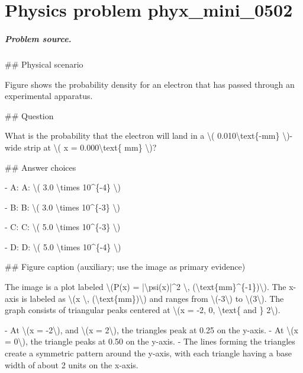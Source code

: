 
\chapter{Physics problem phyx\_mini\_0502}
\label{ch:PhyXMiniProblems_problem_phyx_mini_0502}

\paragraph{Problem source.}
\#\# Physical scenario

Figure shows the probability density for an electron that has passed through an experimental apparatus.

\#\# Question

What is the probability that the electron will land in a \textbackslash{}( 0.010\textbackslash{}text\{-mm\} \textbackslash{})-wide strip at \textbackslash{}( x = 0.000\textbackslash{}text\{ mm\} \textbackslash{})?

\#\# Answer choices

- A: A: \textbackslash{}( 3.0 \textbackslash{}times 10\textasciicircum{}\{-4\} \textbackslash{})

- B: B: \textbackslash{}( 3.0 \textbackslash{}times 10\textasciicircum{}\{-3\} \textbackslash{})

- C: C: \textbackslash{}( 5.0 \textbackslash{}times 10\textasciicircum{}\{-3\} \textbackslash{})

- D: D: \textbackslash{}( 5.0 \textbackslash{}times 10\textasciicircum{}\{-4\} \textbackslash{})

\#\# Figure caption (auxiliary; use the image as primary evidence)

The image is a plot labeled \textbackslash{}(P(x) = |\textbackslash{}psi(x)|\textasciicircum{}2 \textbackslash{}, (\textbackslash{}text\{mm\}\textasciicircum{}\{-1\})\textbackslash{}). The x-axis is labeled as \textbackslash{}(x \textbackslash{}, (\textbackslash{}text\{mm\})\textbackslash{}) and ranges from \textbackslash{}(-3\textbackslash{}) to \textbackslash{}(3\textbackslash{}). The graph consists of triangular peaks centered at \textbackslash{}(x = -2, 0, \textbackslash{}text\{ and \} 2\textbackslash{}).

- At \textbackslash{}(x = -2\textbackslash{}), and \textbackslash{}(x = 2\textbackslash{}), the triangles peak at 0.25 on the y-axis.
- At \textbackslash{}(x = 0\textbackslash{}), the triangle peaks at 0.50 on the y-axis.
- The lines forming the triangles create a symmetric pattern around the y-axis, with each triangle having a base width of about 2 units on the x-axis.

